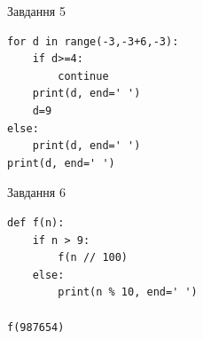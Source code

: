 \documentclass[12pt, ukrainian]{article}
\begin{document}
{\vspace{15mm}
\begin{minipage}[t]{9.7cm}                
{\begin{center}Завдання {5}\end{center}}
\begin{verbatim}
for d in range(-3,-3+6,-3):
    if d>=4:
        continue
    print(d, end=' ')
    d=9
else:
    print(d, end=' ')
print(d, end=' ')
\end{verbatim}     
\end{minipage}
\vline \hspace{8mm}
\begin{minipage}[t]{8.0cm}                
{\begin{center}Завдання {6}\end{center}}
\begin{verbatim}
def f(n):
    if n > 9:
        f(n // 100)
    else:
        print(n % 10, end=' ')

f(987654)
\end{verbatim}     
\end{minipage}

}
\newpage
\end{document}
